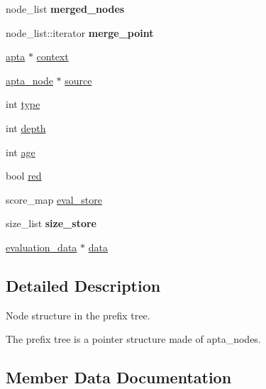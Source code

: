 \begin{DoxyCompactItemize}
\item 
node\+\_\+list {\bfseries merged\+\_\+nodes}\hypertarget{classapta__node_ae34492ec7e932baa6213d6a30e404e49}{}\label{classapta__node_ae34492ec7e932baa6213d6a30e404e49}

\item 
node\+\_\+list\+::iterator {\bfseries merge\+\_\+point}\hypertarget{classapta__node_a37ddeb80d7dd791ce7809faa219eb148}{}\label{classapta__node_a37ddeb80d7dd791ce7809faa219eb148}

\item 
\hyperlink{classapta}{apta} $\ast$ \hyperlink{classapta__node_ae216b528459a269d45957a919a6180e8}{context}
\item 
\hyperlink{classapta__node}{apta\+\_\+node} $\ast$ \hyperlink{classapta__node_a3988cbceb4424c44507237241a430aa4}{source}
\item 
int \hyperlink{classapta__node_a9c1cf7c316ab485ff4435f90dda2766e}{type}
\item 
int \hyperlink{classapta__node_af55f64e7181c083d997bdf8b85cbe4d8}{depth}
\item 
int \hyperlink{classapta__node_a24d4af165b37f04090c85df1ef3ac997}{age}
\item 
bool \hyperlink{classapta__node_ab5e461390057947fba0c8ec64b7fd57a}{red}
\item 
score\+\_\+map \hyperlink{classapta__node_a61b271696a3f73cb1b5c74a303542522}{eval\+\_\+store}
\item 
size\+\_\+list {\bfseries size\+\_\+store}\hypertarget{classapta__node_a0bd52815004e691c4fa942b262477c0a}{}\label{classapta__node_a0bd52815004e691c4fa942b262477c0a}

\item 
\hyperlink{classevaluation__data}{evaluation\+\_\+data} $\ast$ \hyperlink{classapta__node_a9b2762e845a7776004e7edab7dae8718}{data}
\end{DoxyCompactItemize}


\subsection{Detailed Description}
Node structure in the prefix tree. 

The prefix tree is a pointer structure made of apta\+\_\+nodes. 

\subsection{Member Data Documentation}

